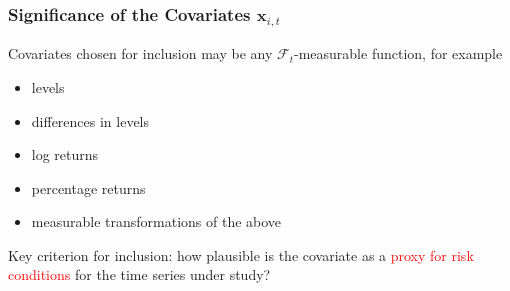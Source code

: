 \documentclass[9pt]{beamer}
\newcommand{\x}{\textbf{x}}
\newcommand{\simiid}{\stackrel{iid}{\sim}} %
\def\E{\mathbb{E}} %
\theoremstyle{definition}
\begin{document}
    \begin{frame}
        \frametitle{Significance of the Covariates $\x_{i,t}$}
        Covariates chosen for inclusion may be any $\mathcal{F}_{t}$-measurable function, for example
        \begin{itemize}
            \item levels
            \item differences in levels
            \item log returns
            \item percentage returns
            \item measurable transformations of the above
        \end{itemize}
    
        \bigbreak 
    
        Key criterion for inclusion: how plausible is the covariate as a \textcolor{red}{proxy for risk conditions} for the time series under study?
    \end{frame}
    
    
    
    
    
    
    
    
    
    
\end{document}

